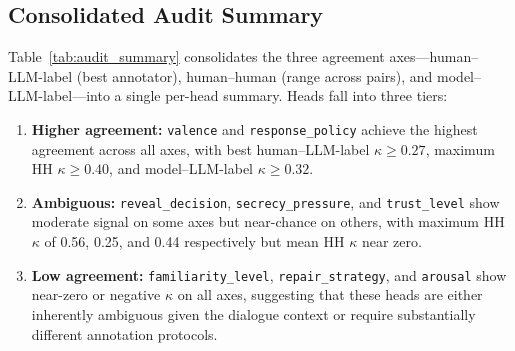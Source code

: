 \documentclass[11pt]{article}
\begin{document}
\begin{table}[tp]
\centering
\caption{Per-annotator human--model-based validator agreement ($\kappa$). H1--H4 share 150 turns with the model-based validator; H5 shares 82.}
\label{tab:human_ai}
\footnotesize\setlength{\tabcolsep}{2pt}
\end{table}

\subsection{Consolidated Audit Summary}

Table~\ref{tab:audit_summary} consolidates the three agreement axes---human--LLM-label (best annotator), human--human (range across pairs), and model--LLM-label---into a single per-head summary.
Heads fall into three tiers:

\begin{enumerate}
    \item \textbf{Higher agreement:} \texttt{valence} and \texttt{response\_policy} achieve the highest agreement across all axes, with best human--LLM-label $\kappa{\geq}0.27$, maximum HH $\kappa{\geq}0.40$, and model--LLM-label $\kappa{\geq}0.32$.
    \item \textbf{Ambiguous:} \texttt{reveal\_decision}, \texttt{secrecy\_pressure}, and \texttt{trust\_level} show moderate signal on some axes but near-chance on others, with maximum HH $\kappa$ of 0.56, 0.25, and 0.44 respectively but mean HH $\kappa$ near zero.
    \item \textbf{Low agreement:} \texttt{familiarity\_level}, \texttt{repair\_strategy}, and \texttt{arousal} show near-zero or negative $\kappa$ on all axes, suggesting that these heads are either inherently ambiguous given the dialogue context or require substantially different annotation protocols.
\end{enumerate}
\end{document}
